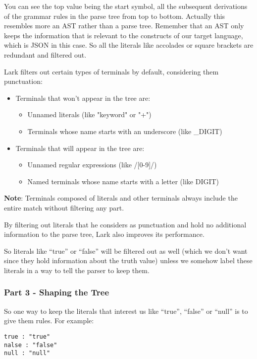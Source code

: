 \documentclass[12pt]{article}
\begin{document}
You can see the top value being the start symbol, all the subsequent derivations of the grammar rules in the parse tree from top to bottom. Actually this resembles more an AST rather than a parse tree. Remember that an AST only keeps the information that is relevant to the constructs of our target language, which is JSON in this case. So all the literals like accolades or square brackets are redundant and filtered out. 

Lark filters out certain types of terminals by default, considering them punctuation:
\begin{itemize}
    \item Terminals that won't appear in the tree are:
    \begin{itemize}
        \item Unnamed literals (like "keyword" or "+")
        \item Terminals whose name starts with an underscore (like \_DIGIT)
    \end{itemize}
    \item Terminals that will appear in the tree are:
    \begin{itemize}
        \item Unnamed regular expressions (like /[0-9]/)
        \item Named terminals whose name starts with a letter (like DIGIT)
    \end{itemize}
\end{itemize}

\textbf{Note}: Terminals composed of literals and other terminals always include the entire match without filtering any part.

By filtering out literals that he considers as punctuation and hold no additional information to the parse tree, Lark also improves its performance.

So literals like “true” or “false” will be filtered out as well (which we don’t want since they hold information about the truth value) unless we somehow label these literals in a way to tell the parser to keep them.

\subsubsection{Part 3 - Shaping the Tree}

So one way to keep the literals that interest us like “true”, “false” or “null” is to give them rules. For example:

\begin{lstlisting}
true : "true"
nalse : "false"
null : "null"
\end{lstlisting}
\end{document}
